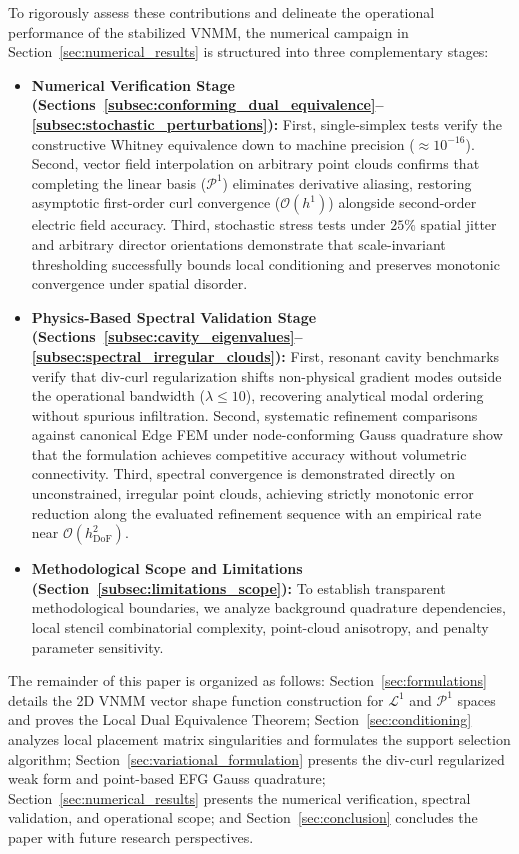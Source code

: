 \documentclass[preprint,12pt]{elsarticle}
\begin{document}
To rigorously assess these contributions and delineate the operational performance of the stabilized VNMM, the numerical campaign in Section~\ref{sec:numerical_results} is structured into three complementary stages:
\begin{itemize}
    \item \textbf{Numerical Verification Stage (Sections~\ref{subsec:conforming_dual_equivalence}--\ref{subsec:stochastic_perturbations}):}
          First, single-simplex tests verify the constructive Whitney equivalence down to machine precision ($\approx 10^{-16}$). Second, vector field interpolation on arbitrary point clouds confirms that completing the linear basis ($\mathcal{P}^1$) eliminates derivative aliasing, restoring asymptotic first-order curl convergence ($\mathcal{O}(h^1)$) alongside second-order electric field accuracy. Third, stochastic stress tests under $25\%$ spatial jitter and arbitrary director orientations demonstrate that scale-invariant thresholding successfully bounds local conditioning and preserves monotonic convergence under spatial disorder.

    \item \textbf{Physics-Based Spectral Validation Stage (Sections~\ref{subsec:cavity_eigenvalues}--\ref{subsec:spectral_irregular_clouds}):}
          First, resonant cavity benchmarks verify that div-curl regularization shifts non-physical gradient modes outside the operational bandwidth ($\lambda \le 10$), recovering analytical modal ordering without spurious infiltration. Second, systematic refinement comparisons against canonical Edge FEM under node-conforming Gauss quadrature show that the formulation achieves competitive accuracy without volumetric connectivity. Third, spectral convergence is demonstrated directly on unconstrained, irregular point clouds, achieving strictly monotonic error reduction along the evaluated refinement sequence with an empirical rate near $\mathcal{O}(h_{\mathrm{DoF}}^2)$.

    \item \textbf{Methodological Scope and Limitations (Section~\ref{subsec:limitations_scope}):}
          To establish transparent methodological boundaries, we analyze background quadrature dependencies, local stencil combinatorial complexity, point-cloud anisotropy, and penalty parameter sensitivity.
\end{itemize}

The remainder of this paper is organized as follows: Section~\ref{sec:formulations} details the 2D VNMM vector shape function construction for $\mathcal{L}^1$ and $\mathcal{P}^1$ spaces and proves the Local Dual Equivalence Theorem; Section~\ref{sec:conditioning} analyzes local placement matrix singularities and formulates the support selection algorithm; Section~\ref{sec:variational_formulation} presents the div-curl regularized weak form and point-based EFG Gauss quadrature; Section~\ref{sec:numerical_results} presents the numerical verification, spectral validation, and operational scope; and Section~\ref{sec:conclusion} concludes the paper with future research perspectives.
\end{document}

